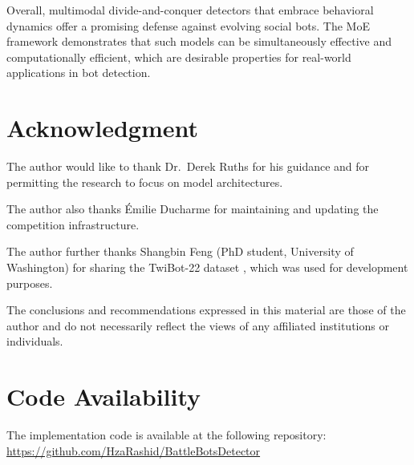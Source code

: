 \documentclass[conference]{IEEEtran}
\begin{document}
Overall, multimodal divide-and-conquer detectors that embrace behavioral dynamics 
offer a promising defense against evolving social bots.
The MoE framework demonstrates that such models can be 
simultaneously effective and computationally efficient, 
which are desirable properties for real-world applications 
in bot detection.

\section*{Acknowledgment}
The author would like to thank Dr.\ Derek Ruths for his guidance
and for permitting the research to focus on model architectures.

The author also thanks Émilie Ducharme for maintaining and updating the competition infrastructure.

The author further thanks Shangbin Feng (PhD student, University of Washington)
for sharing the TwiBot-22 dataset \citep{feng2022twibot22}, which was used for development purposes.

The conclusions and recommendations expressed in this material are those of the author 
and do not necessarily reflect the views of any affiliated institutions or individuals.

\section*{Code Availability}
The implementation code is available at the following repository: \url{https://github.com/HzaRashid/BattleBotsDetector}

% 


\end{document}
